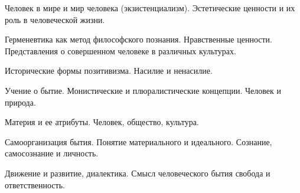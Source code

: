 \documentclass[
	14pt,
	a4paper,
	]
	{scrartcl}
\begin{document}
\newpage


\shapk
{}
\setcounter{zad}{0}

\vfill
\z 	Человек в мире и мир человека (экзистенциализм).
 \vfill
\z 	Эстетические ценности и их роль в человеческой жизни.
 \vfill

\vfill

\newpage


\shapk
{}
\setcounter{zad}{0}

\vfill
\z 	Герменевтика как метод философского познания.
 \vfill
\z 	Нравственные ценности. Представления о совершенном человеке в различных культурах.
 \vfill

\vfill

\newpage


\shapk
{}
\setcounter{zad}{0}

\vfill
\z 	Исторические формы позитивизма. 
 \vfill
\z 	Насилие и ненасилие.
 \vfill

\vfill

\newpage


\shapk
{}
\setcounter{zad}{0}

\vfill
\z 	 Учение о бытие. Монистические и плюралистические концепции.
 \vfill
\z 	Человек и природа.
 \vfill

\vfill

\newpage


\shapk
{}
\setcounter{zad}{0}

\vfill
\z 	Материя и ее атрибуты.
 \vfill
\z 	Человек, общество, культура.
 \vfill

\vfill

\newpage


\shapk
{}
\setcounter{zad}{0}

\vfill
\z 	Самоорганизация бытия. Понятие материального и идеального.
 \vfill
\z 	Сознание, самосознание и личность.
 \vfill

\vfill

\newpage


\shapk
{}
\setcounter{zad}{0}

\vfill
\z 	Движение и развитие, диалектика.
 \vfill
\z 	Смысл человеческого бытия свобода и ответственность.
 \vfill

\vfill

\newpage


\shapk
{}
\setcounter{zad}{0}
\end{document}
